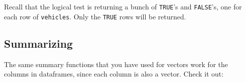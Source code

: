\documentclass[
]{book}
\newenvironment{Shaded}{\begin{snugshade}}{\end{snugshade}}
\newcommand{\DecValTok}[1]{\textcolor[rgb]{0.00,0.00,0.81}{#1}}
\newcommand{\FloatTok}[1]{\textcolor[rgb]{0.00,0.00,0.81}{#1}}
\newcommand{\FunctionTok}[1]{\textcolor[rgb]{0.00,0.00,0.00}{#1}}
\newcommand{\NormalTok}[1]{#1}
\newcommand{\SpecialCharTok}[1]{\textcolor[rgb]{0.00,0.00,0.00}{#1}}
\newcommand{\StringTok}[1]{\textcolor[rgb]{0.31,0.60,0.02}{#1}}
\begin{document}
Recall that the logical test is returning a bunch of \texttt{TRUE}'s and \texttt{FALSE}'s, one for each row of \texttt{vehicles}. Only the \texttt{TRUE} rows will be returned.

\hypertarget{summarizing}{%
\subsection*{Summarizing}\label{summarizing}}

The same summary functions that you have used for vectors work for the columns in dataframes, since each column is also a vector. Check it out:

\begin{Shaded}
\end{Shaded}

\begin{Shaded}
\end{Shaded}

\begin{Shaded}
\end{Shaded}

\begin{Shaded}
\end{Shaded}

\begin{Shaded}
\end{Shaded}
\end{document}
